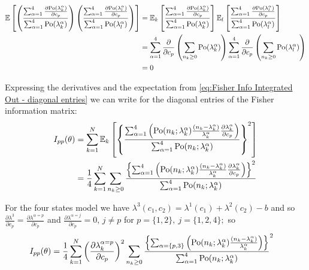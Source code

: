 \begin{alignat*}{1}
	\mathbb{E}\left[\left(\frac{\sum_{\alpha=1}^4\frac{\partial\mathrm{Po}(\lambda_k^\alpha)}{\partial c_p}}{\sum_{\alpha=1}^4\mathrm{Po}(\lambda_k^\alpha)}\right)\left(\frac{\sum_{\alpha=1}^4\frac{\partial\mathrm{Po}(\lambda_l^\alpha)}{\partial c_p}}{\sum_{\alpha=1}^4\mathrm{Po}(\lambda_l^\alpha)}\right)\right] 
	& =\mathbb{E}_k\left[\frac{\sum_{\alpha=1}^4\frac{\partial\mathrm{Po}(\lambda_k^\alpha)}{\partial c_p}}{\sum_{\alpha=1}^4\mathrm{Po}(\lambda_k^\alpha)}\right]\mathbb{E}_l\left[\frac{\sum_{\alpha=1}^4\frac{\partial\mathrm{Po}(\lambda_l^\alpha)}{\partial c_p}}{\sum_{\alpha=1}^4\mathrm{Po}(\lambda_l^\alpha)}\right]\\
 	& =\sum_{\alpha=1}^4\frac{\partial}{\partial c_p}\left(\sum_{n_k\geq0}\mathrm{Po}(\lambda_k^\alpha)\right)\sum_{\alpha=1}^4\frac{\partial}{\partial c_p}\left(\sum_{n_k\geq0}\mathrm{Po}(\lambda_l^\alpha)\right)\\
 	& =0
\end{alignat*}

Expressing the derivatives and the expectation from \autoref{eq:Fisher Info Integrated Out - diagonal entries} we can write for the diagonal entries of the Fisher information matrix:
%
\begin{alignat*}{1}
	I_{pp}(\theta) & =\sum_{k=1}^N\mathbb{E}_k\left[\left\{ \frac{\sum_{\alpha=1}^4\left(\mathrm{Po}(n_k;\lambda_k^\alpha)\frac{(n_k-\lambda_k^\alpha)}{\lambda_k^\alpha}\frac{\partial\lambda_k^\alpha}{\partial c_p}\right)}{\sum_{\alpha=1}^4\mathrm{Po}(n_k;\lambda_k^\alpha)}\right\} ^2\right]\\
 	& =\frac{1}{4}\sum_{k=1}^N\sum_{n_k\geq0}\frac{\left\{ \sum_{\alpha=1}^4\left(\mathrm{Po}(n_k;\lambda_k^\alpha)\frac{(n_k-\lambda_k^\alpha)}{\lambda_k^\alpha}\frac{\partial\lambda_k^\alpha}{\partial c_p}\right)\right\} ^2}{\sum_{\alpha=1}^4\mathrm{Po}(n_k;\lambda_k^\alpha)}
\end{alignat*}

For the four states model we have $\lambda^3(c_1,c_2)=\lambda^1(c_1)+\lambda^2(c_2)-b$ and so $\frac{\partial\lambda^3}{\partial c_p}=\frac{\partial\lambda^{\alpha=p}}{\partial c_p}$ and $\frac{\partial\lambda^{\alpha=j}}{\partial c_p}=0,\, j\neq p$ for $p=\{1,2\},\: j=\{1,2,4\};$ so 
%
\begin{alignat*}{1}
	I_{pp}(\theta) & =\frac{1}{4}\sum_{k=1}^N\left(\frac{\partial\lambda_k^{\alpha=p}}{\partial c_p}\right)^2\sum_{n_k\geq0}\frac{\left\{\sum_{\alpha=\{p,3\}}\left(\mathrm{Po}(n_k;\lambda_k^\alpha)\frac{(n_k-\lambda_k^\alpha)}{\lambda_k^\alpha}\right)\right\}}{\sum_{\alpha=1}^4\mathrm{Po}(n_k;\lambda_k^\alpha)} ^2
\end{alignat*}


